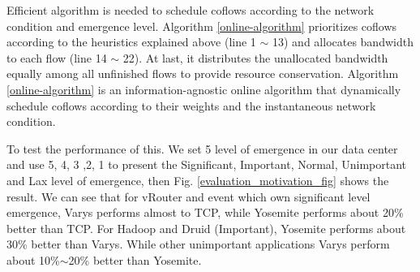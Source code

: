 \documentclass[10pt, conference, letterpaper]{IEEEtran}
\begin{document}
Efficient algorithm is needed to schedule coflows according to the network condition and emergence level.
Algorithm \ref{online-algorithm} prioritizes coflows according to the heuristics explained above (line 1 $\sim$ 13) and allocates bandwidth to each flow (line 14 $\sim$ 22). At last, it distributes the unallocated bandwidth equally among all unfinished flows to provide resource conservation.
Algorithm \ref{online-algorithm}  is an information-agnostic online algorithm that dynamically schedule coflows according to their weights and the instantaneous network condition.


To test the performance of this.  We set 5 level of emergence in our data center and use 5, 4, 3 ,2, 1 to present the Significant, Important, Normal, Unimportant and Lax level of emergence, then Fig. \ref{evaluation_motivation_fig} shows the result.
We can see that for vRouter and event which own significant level emergence,
Varys performs almost to TCP, while Yosemite performs about 20\% better than TCP.
For Hadoop and Druid (Important), Yosemite performs about 30\% better than Varys.
While other unimportant applications Varys perform about 10\%$\sim$20\% better than Yosemite.




\end{document}

